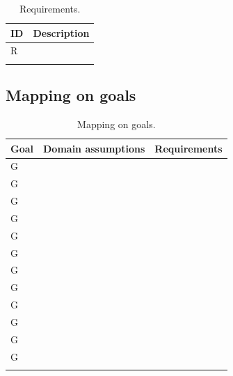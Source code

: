\setcounter{req}{1}
\newcommand{\creq}{\thereq\stepcounter{req}}
\begin{center}
    \begin{longtable}{|l|l|}
        \hline
        \textbf{ID} & \textbf{Description} \\
        \hline
        R\creq      &                      \\
        \hline
        \caption{Requirements.}
        \label{tab: req}%
    \end{longtable}
\end{center}

\subsection{Mapping on goals}
\label{subsec: map_on_g}%

\setcounter{mg}{1}
\newcommand{\cmg}{\themg\stepcounter{mg}}
\begin{center}
    \begin{longtable}{|l|l|l|}
        \hline
        \textbf{Goal} & \textbf{Domain assumptions} & \textbf{Requirements} \\
        \hline
        G\cmg         &                             &                       \\
        \hline
        G\cmg         &                             &                       \\
        \hline
        G\cmg         &                             &                       \\
        \hline
        G\cmg         &                             &                       \\
        \hline
        G\cmg         &                             &                       \\
        \hline
        G\cmg         &                             &                       \\
        \hline
        G\cmg         &                             &                       \\
        \hline
        G\cmg         &                             &                       \\
        \hline
        G\cmg         &                             &                       \\
        \hline
        G\cmg         &                             &                       \\
        \hline
        G\cmg         &                             &                       \\
        \hline
        G\cmg         &                             &                       \\
        \hline
        \caption{Mapping on goals.}
        \label{tab: map_on_g}%
    \end{longtable}
\end{center}

